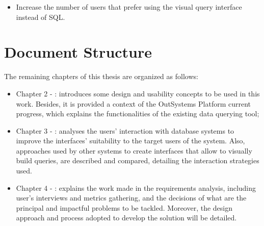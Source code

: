 \begin{itemize}
  \item Increase the number of users that prefer using the visual query interface instead of SQL.
\end{itemize} 

\section{Document Structure}
\label{sec:document_structure}

The remaining chapters of this thesis are organized as follows:

\begin{itemize}
  \item Chapter 2 - : introduces some design and usability concepts to be used in this work. Besides, it is provided a context of the OutSystems Platform current progress, which explains the functionalities of the existing data querying tool;
  \item Chapter 3 - : analyses the users' interaction with database systems to improve the interfaces' suitability to the target users of the system. Also, approaches used by other systems to create interfaces that allow to visually build queries, are described and compared, detailing the interaction strategies used.
  \item Chapter 4 - : explains the work made in the requirements analysis, including user's interviews and metrics gathering, and the decisions of what are the principal and impactful problems to be tackled. Moreover, the design approach and process adopted to develop the solution will be detailed.
\end{itemize}
